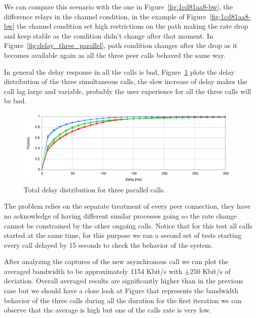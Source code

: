 We can compare this scenario with the one in Figure~\ref{fig:1cd81aa8-bw}, the difference relays in the channel condition, in the example of Figure~\ref{fig:1cd81aa8-bw} the channel condition set high restrictions on the path making the rate drop and keep stable as the condition didn't change after that moment. In Figure~\ref{fig:delay_three_parallel}, path condition changes after the drop as it becomes available again as all the three peer calls behaved the same way. 

In general the delay response in all the calls is bad, Figure~\ref{fig:delayThreeCalls} plots the delay distribution of the three simultaneous calls, the slow increase of delay makes the call lag large and variable, probably the user experience for all the three calls will be bad.

\begin{figure}[h]
  \centering
    \includegraphics[width=1\textwidth]{./figures/three_parallel_total_delay_distribution.pdf}
      \caption[Total delay distribution for three parallel calls]{Total delay distribution for three parallel calls.}
	\label{fig:delayThreeCalls}
\end{figure}

The problem relies on the separate treatment of every peer connection, they have no acknowledge of having different similar processes going so the rate change cannot be constrained by the other ongoing calls. Notice that for this test all calls started at the same time, for this purpose we ran a second set of tests starting every call delayed by 15 seconds to check the behavior of the system.

After analyzing the captures of the new asynchronous call we can plot the averaged bandwidth to be approximately 1154 Kbit/s with $\pm250$ Kbit/s of deviation. Overall averaged results are significantly higher than in the previous case but we should have a close look at Figure that represents the bandwidth behavior of the three calls during all the duration for the first iteration we can observe that the average is high but one of the calls rate is very low.

